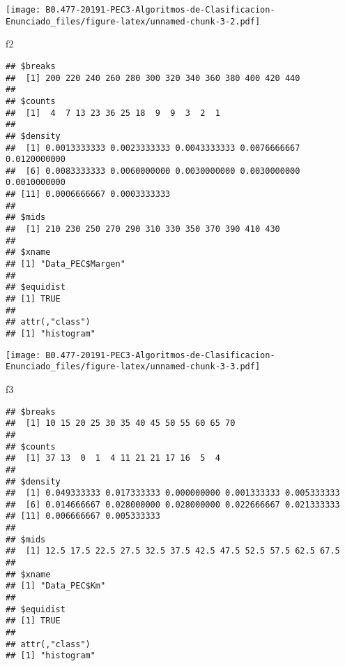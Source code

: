 \documentclass[]{article}
\newenvironment{Shaded}{\begin{snugshade}}{\end{snugshade}}
\newcommand{\KeywordTok}[1]{\textcolor[rgb]{0.94,0.87,0.69}{#1}}
\newcommand{\DataTypeTok}[1]{\textcolor[rgb]{0.87,0.87,0.75}{#1}}
\newcommand{\StringTok}[1]{\textcolor[rgb]{0.80,0.58,0.58}{#1}}
\newcommand{\CommentTok}[1]{\textcolor[rgb]{0.50,0.62,0.50}{#1}}
\newcommand{\OtherTok}[1]{\textcolor[rgb]{0.94,0.94,0.56}{#1}}
\newcommand{\OperatorTok}[1]{\textcolor[rgb]{0.94,0.94,0.82}{#1}}
\newcommand{\NormalTok}[1]{\textcolor[rgb]{0.80,0.80,0.80}{#1}}
\begin{document}
\texttt{[image: B0.477-20191-PEC3-Algoritmos-de-Clasificacion-Enunciado\_files/figure-latex/unnamed-chunk-3-2.pdf]}

\begin{Shaded}
\begin{Highlighting}[]
\NormalTok{f2}
\end{Highlighting}
\end{Shaded}

\begin{verbatim}
## $breaks
##  [1] 200 220 240 260 280 300 320 340 360 380 400 420 440
## 
## $counts
##  [1]  4  7 13 23 36 25 18  9  9  3  2  1
## 
## $density
##  [1] 0.0013333333 0.0023333333 0.0043333333 0.0076666667 0.0120000000
##  [6] 0.0083333333 0.0060000000 0.0030000000 0.0030000000 0.0010000000
## [11] 0.0006666667 0.0003333333
## 
## $mids
##  [1] 210 230 250 270 290 310 330 350 370 390 410 430
## 
## $xname
## [1] "Data_PEC$Margen"
## 
## $equidist
## [1] TRUE
## 
## attr(,"class")
## [1] "histogram"
\end{verbatim}

\begin{Shaded}
\end{Shaded}

\texttt{[image: B0.477-20191-PEC3-Algoritmos-de-Clasificacion-Enunciado\_files/figure-latex/unnamed-chunk-3-3.pdf]}

\begin{Shaded}
\begin{Highlighting}[]
\NormalTok{f3}
\end{Highlighting}
\end{Shaded}

\begin{verbatim}
## $breaks
##  [1] 10 15 20 25 30 35 40 45 50 55 60 65 70
## 
## $counts
##  [1] 37 13  0  1  4 11 21 21 17 16  5  4
## 
## $density
##  [1] 0.049333333 0.017333333 0.000000000 0.001333333 0.005333333
##  [6] 0.014666667 0.028000000 0.028000000 0.022666667 0.021333333
## [11] 0.006666667 0.005333333
## 
## $mids
##  [1] 12.5 17.5 22.5 27.5 32.5 37.5 42.5 47.5 52.5 57.5 62.5 67.5
## 
## $xname
## [1] "Data_PEC$Km"
## 
## $equidist
## [1] TRUE
## 
## attr(,"class")
## [1] "histogram"
\end{verbatim}
\end{document}
